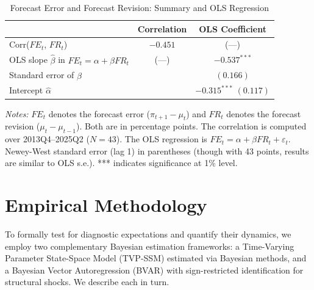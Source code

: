 \documentclass[12pt]{article}
\begin{document}
\begin{table}[!htbp]
    \centering
    \caption{Forecast Error and Forecast Revision: Summary and OLS Regression}
    \label{tab:fe_fr}
    \begin{threeparttable}
        \begin{tabular}{lcc}
            \toprule
                                                                    & \textbf{Correlation} & \textbf{OLS Coefficient} \\
            \midrule
            Corr($FE_t$, $FR_t$)                                    & $-0.451$             & (---)                    \\
            OLS slope $\hat{\beta}$ in $FE_t = \alpha + \beta FR_t$ & (---)                & $-0.537^{***}$           \\
            Standard error of $\hat{\beta}$                         &                      & $(0.166)$                \\
            Intercept $\hat{\alpha}$                                &                      & $-0.315^{***}$ $(0.117)$ \\
            \bottomrule
        \end{tabular}
        \begin{tablenotes}
            \footnotesize
            \item \textit{Notes:} $FE_t$ denotes the forecast error ($\pi_{t+1}-\mu_t$) and $FR_t$ denotes the forecast revision ($\mu_t - \mu_{t-1}$). Both are in percentage points. The correlation is computed over 2013Q4--2025Q2 ($N=43$). The OLS regression is $FE_t = \alpha + \beta FR_t + \varepsilon_t$. Newey-West standard error (lag 1) in parentheses (though with 43 points, results are similar to OLS s.e.). *** indicates significance at 1\% level.
        \end{tablenotes}
    \end{threeparttable}
\end{table}





\section{Empirical Methodology}\label{sec:methods}
To formally test for diagnostic expectations and quantify their dynamics, we employ two complementary Bayesian estimation frameworks: a Time-Varying Parameter State-Space Model (TVP-SSM) estimated via Bayesian methods, and a Bayesian Vector Autoregression (BVAR) with sign-restricted identification for structural shocks. We describe each in turn.
\end{document}
